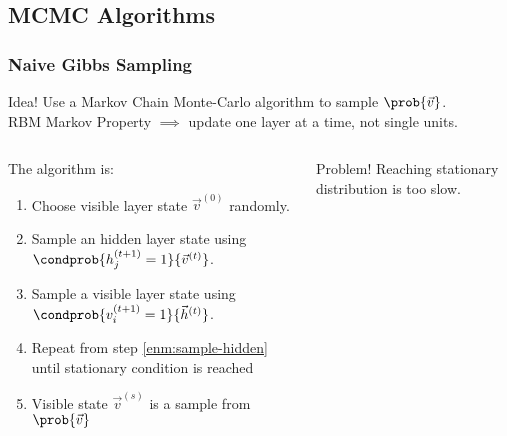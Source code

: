 \subsection{MCMC Algorithms}
\begin{frame}
  \frametitle{Naive Gibbs Sampling}
  \begin{alertblock}{Idea!}
    Use a \alert{Markov Chain Monte-Carlo} algorithm to sample \(\prob{\vec{v}}\).\\
    RBM Markov Property \(\implies\) update one layer at a time, not single units.
  \end{alertblock}
  \vfill
  \begin{columns}
    \begin{column}{0.65\textwidth}
      The algorithm is:
      \begin{enumerate}
        \item Choose visible layer state \(\vec{v}^{(0)}\) randomly.
        \item\label{enm:sample-hidden} Sample an hidden layer state using \(\condprob{h^{(t+1)}_j=1}{\vec{v}^{(t)}}\).
        \item Sample a visible layer state using \(\condprob{v^{(t+1)}_i=1}{\vec{h}^{(t)}}\).
        \item Repeat from step \ref{enm:sample-hidden} until stationary condition is reached
        \item Visible state \(\vec{v}^{(s)}\) is a sample from \(\prob{\vec{v}}\)
      \end{enumerate}
    \end{column}
    \begin{column}{0.30\textwidth}
      \begin{alertblock}{Problem!}
        Reaching stationary distribution is too slow.
      \end{alertblock}
    \end{column}
  \end{columns}
\end{frame}


